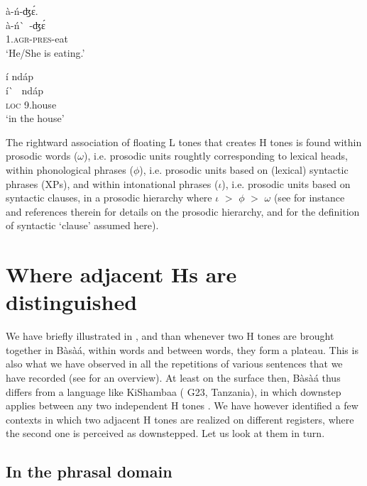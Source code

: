 \documentclass[output=paper,newtxmath,modfonts,nonflat,hidelinks]{langsci/langscibook}
\begin{document}
\ea à-ń-{\textdownstep}ʤ\'ɛ. \label{ex:HamlaouiMakasso:3}\\
\gll à-ń\`~-ʤ\'ɛ\\ 
1.\textsc{agr}-\textsc{pres}-eat\\
\glt `He/She is eating.'
\z


\ea í {\textdownstep}nd{á}p \label{ex:HamlaouiMakasso:4} \\
 \gll í\`~ nd{á}p\\
\textsc{loc} 9.house\\
\glt `in the house'
\z

\noindent
The rightward association of floating L tones that creates {\textdownstep}H tones is found within prosodic words ($\omega$), i.e. prosodic units roughtly corresponding to lexical heads, within phonological phrases ($\phi$), i.e. prosodic units based on (lexical) syntactic phrases (XPs), and within intonational phrases ($\iota$), i.e. prosodic units based on syntactic clauses, in a prosodic hierarchy where $\iota$ $>$ $\phi$ $>$ $\omega$ (see for instance \citet{Selkirk11} and references therein for details on the prosodic hierarchy, and \citet{HamlaouiSzendroi15, HamlaouiSzendroi16} for the definition of syntactic `clause' assumed here).


\section{Where adjacent Hs are distinguished}\label{sec:HamlaouiMakasso:3} 

We have briefly illustrated in ,  and  than whenever two H tones are brought together in Bàsà{á}, within words and between words, they form a plateau. This is also what we have observed in all the repetitions of various sentences that we have recorded (see \citet{MakassoEtAl17} for an overview). At least on the surface then, Bàsà{á} thus differs from a language like KiShambaa ( G23, Tanzania), in which downstep applies between any two independent H tones \citep{Odden82}. We have however identified a few contexts in which two adjacent H tones are realized on different registers, where the second one is perceived as downstepped. Let us look at them in turn.



\subsection{In the phrasal domain}
\end{document}
